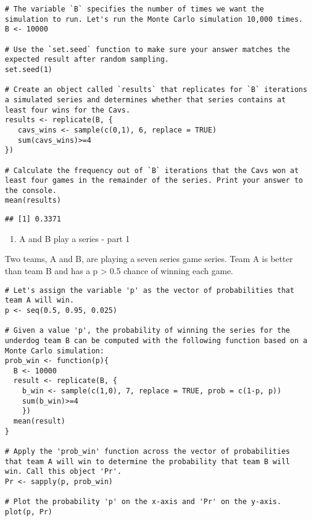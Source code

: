 \documentclass[
]{article}
\providecommand{\tightlist}{%
  \setlength{\itemsep}{0pt}\setlength{\parskip}{0pt}}
\begin{document}
\begin{verbatim}
# The variable `B` specifies the number of times we want the simulation to run. Let's run the Monte Carlo simulation 10,000 times.
B <- 10000

# Use the `set.seed` function to make sure your answer matches the expected result after random sampling.
set.seed(1)

# Create an object called `results` that replicates for `B` iterations a simulated series and determines whether that series contains at least four wins for the Cavs.
results <- replicate(B, {
   cavs_wins <- sample(c(0,1), 6, replace = TRUE)
   sum(cavs_wins)>=4
})

# Calculate the frequency out of `B` iterations that the Cavs won at least four games in the remainder of the series. Print your answer to the console.
mean(results)
\end{verbatim}

\begin{verbatim}
## [1] 0.3371
\end{verbatim}

\begin{enumerate}
\def\labelenumi{\arabic{enumi}.}
\setcounter{enumi}{2}
\tightlist
\item
  A and B play a series - part 1
\end{enumerate}

Two teams, A and B, are playing a seven series game series. Team A is
better than team B and has a p \textgreater{} 0.5 chance of winning each
game.

\begin{verbatim}
# Let's assign the variable 'p' as the vector of probabilities that team A will win.
p <- seq(0.5, 0.95, 0.025)

# Given a value 'p', the probability of winning the series for the underdog team B can be computed with the following function based on a Monte Carlo simulation:
prob_win <- function(p){
  B <- 10000
  result <- replicate(B, {
    b_win <- sample(c(1,0), 7, replace = TRUE, prob = c(1-p, p))
    sum(b_win)>=4
    })
  mean(result)
}

# Apply the 'prob_win' function across the vector of probabilities that team A will win to determine the probability that team B will win. Call this object 'Pr'.
Pr <- sapply(p, prob_win)

# Plot the probability 'p' on the x-axis and 'Pr' on the y-axis.
plot(p, Pr)
\end{verbatim}
\end{document}
